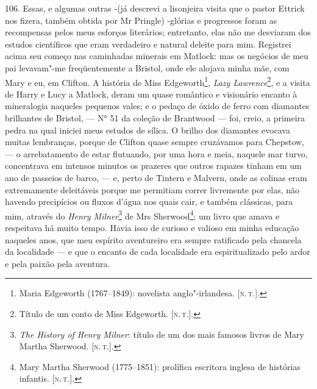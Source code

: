 106. Essas, e algumas outras -(já descrevi a lisonjeira visita que o
pastor Ettrick nos fizera, também obtida por Mr Pringle) -glórias e
progressos foram as recompensas pelos meus esforços literários;
entretanto, elas não me desviaram dos estudos científicos que eram
verdadeiro e natural deleite para mim. Registrei acima seu começo nas
caminhadas minerais em Matlock: mas os negócios de meu pai levavam"-me
freqüentemente a Bristol, onde ele alojava minha mãe, com Mary e eu, em
Clifton. A história de Miss Edgeworth\footnote{Maria Edgeworth
  (1767--1849): novelista anglo"-irlandesa. {[}\textsc{n.\,t.}{]}.}, \emph{Lazy
Lawrence}\footnote{Título de um conto de Miss Edgeworth. {[}\textsc{n.\,t.}{]}.},
e a visita de Harry e Lucy a Matlock, deram um quase romântico e
visionário encanto à mineralogia naqueles pequenos vales; e o pedaço de
óxido de ferro com diamantes brilhantes de Bristol, --- N° 51 da coleção
de Brantwood --- foi, creio, a primeira pedra na qual iniciei meus
estudos de sílica. O brilho dos diamantes evocava muitas lembranças,
porque de Clifton quase sempre cruzávamos para Chepstow, --- o
arrebatamento de estar flutuando, por uma hora e meia, naquele mar
turvo, concentrava em intensos minutos os prazeres que outros rapazes
tinham em um ano de passeios de barco, --- e, perto de Tintern e Malvern,
onde as colinas eram extremamente deleitáveis porque me permitiam correr
livremente por elas, não havendo precipícios ou fluxos d'água nos quais
cair, e também clássicas, para mim, através do \emph{Henry
Milner}\footnote{\emph{The History of Henry Milner}: título de um dos
  mais famosos livros de Mary Martha Sherwood. {[}\textsc{n.\,t.}{]}.} de Mrs
Sherwood\footnote{Mary Martha Sherwood (1775--1851): prolífica escritora
  inglesa de histórias infantis. {[}\textsc{n.\,t.}{]}.}; um livro que amava e
respeitava há muito tempo. Havia isso de curioso e valioso em minha
educação naqueles anos, que meu espírito aventureiro era sempre
ratificado pela chancela da localidade --- e que o encanto de cada
localidade era espiritualizado pelo ardor e pela paixão pela aventura.

